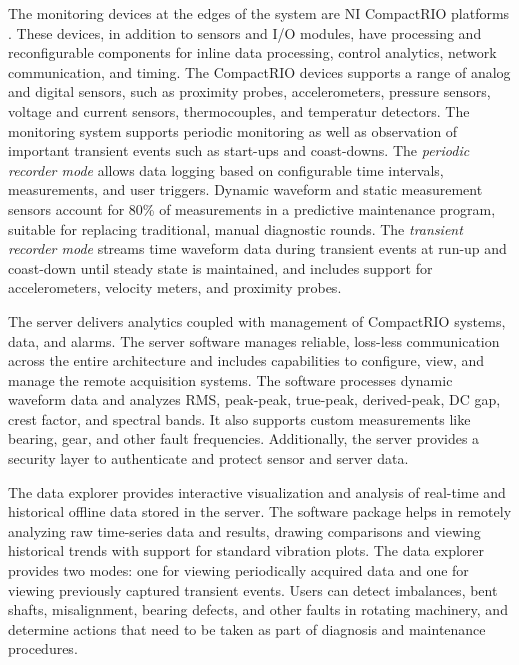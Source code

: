 

The monitoring devices at the edges of the system are NI CompactRIO platforms \cite{ni_crio}.
These devices, in addition to sensors and I/O modules, have processing and reconfigurable components for inline data processing, control analytics, network communication, and timing.
The CompactRIO devices supports a range of analog and digital sensors, such as proximity probes, accelerometers, pressure sensors, voltage and current sensors, thermocouples, and temperatur detectors. 
The monitoring system supports periodic monitoring as well as observation of important transient events such as start-ups and coast-downs. 
The {\em periodic recorder mode} allows data logging based on configurable time intervals, measurements, and user triggers. 
Dynamic waveform and static measurement sensors account for 80\% of measurements in a predictive maintenance program, suitable for replacing traditional, manual diagnostic rounds. 
The {\em transient recorder mode} streams time waveform data during transient events at run-up and coast-down until steady state is maintained, and includes support for accelerometers, velocity meters, and proximity probes. 

The server delivers 
analytics coupled with management of CompactRIO systems, data, and alarms. The server software manages reliable, loss-less communication across the entire architecture and includes capabilities to configure, view, and manage the remote acquisition systems. 
The software processes dynamic waveform data and analyzes RMS, peak-peak, true-peak, derived-peak, DC gap, crest factor, and spectral bands. It also supports custom measurements like bearing, gear, and other fault frequencies. Additionally, the server provides a security layer to authenticate and protect sensor and server data.

The data explorer provides
interactive visualization and analysis of real-time and historical offline data stored in the server. The software package helps in remotely analyzing raw time-series data and results, drawing comparisons and viewing historical trends with support for standard vibration plots. The data explorer provides two modes: one for viewing periodically acquired data and one for viewing previously captured transient events. Users can detect imbalances, bent shafts, misalignment, bearing defects, and other faults in rotating machinery, and determine actions that need to be taken as part of diagnosis and maintenance procedures.

